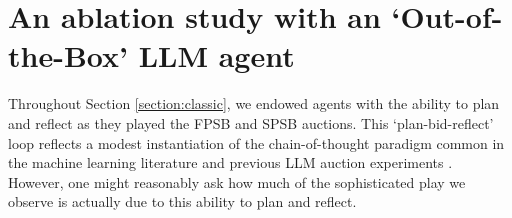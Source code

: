 \documentclass{article} %
\begin{document}



\section{An ablation study with an `Out-of-the-Box' LLM agent}\label{session: off-the-box}

Throughout Section \ref{section:classic}, we endowed agents with the ability to plan and reflect as they played the FPSB and SPSB auctions. This `plan-bid-reflect' loop reflects a modest instantiation of the chain-of-thought paradigm common in the machine learning literature and previous LLM auction experiments \citep{wei2022chain, fish2024algorithmic}. However, one might reasonably ask how much of the sophisticated play we observe is actually due to this  ability to plan and reflect. 
\end{document}
